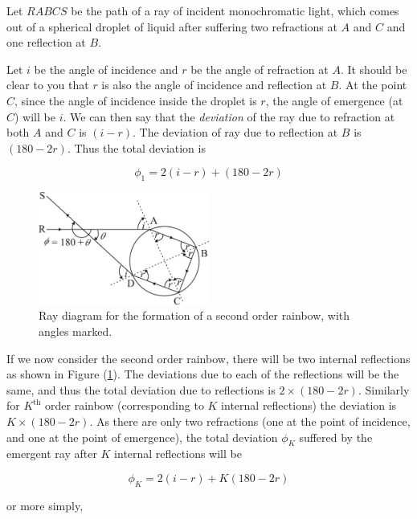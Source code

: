 Let $RABCS$ be the path of a ray of incident monochromatic light, which comes out of a spherical droplet of liquid after suffering two refractions at $A$ and $C$ and one reflection at $B$.

Let $i$ be the angle of incidence and $r$ be the angle of refraction at $A$. It should be clear to you that $r$ is also the angle of incidence and reflection at $B$. At the point $C$, since the angle of incidence inside the droplet is $r$, the angle of emergence (at $C$) will be $i$. We can then say that the \textit{deviation} of the ray due to refraction at both $A$ and $C$ is $(i-r)$. The deviation of ray due to reflection at $B$ is $(180 - 2r)$. Thus the total deviation is

\begin{equation}
\phi_{1}=2(i-r)+(180-2r)
\end{equation}


\begin{figure}[!htb]
    \centering
    \includegraphics[width=0.5\textwidth]{figs/img4.jpg}
    \caption{Ray diagram for the formation of a second order rainbow, with angles marked.}
    \label{fig:secondorder}
\end{figure}


If we now consider the second order rainbow, there will be two internal reflections as shown in Figure (\ref{fig:secondorder}). The deviations due to each of the reflections will be the same, and thus the total deviation due to reflections is $2\times (180 - 2r)$. Similarly for $K^\text{th}$ order rainbow (corresponding to $K$ internal reflections) the deviation is $K\times(180 - 2r)$. As there are only two refractions (one at the point of incidence, and one at the point of emergence), the total deviation $\phi_K$ suffered by the emergent ray after $K$ internal reflections will be

\begin{equation*}
    \phi_K = 2(i-r) + K(180-2r)
\end{equation*}

or more simply, 

